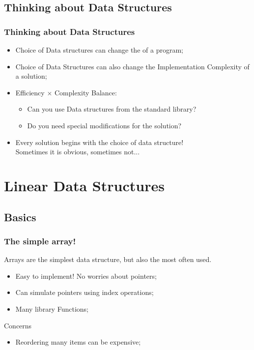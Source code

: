 \documentclass{beamer}
\begin{document}
\subsection{Thinking about Data Structures}
\begin{frame}
  \frametitle{Thinking about Data Structures}
  \begin{itemize}
  \item Choice of Data structures can change the  of a program;
  \item Choice of Data Structures can also change the \alert{Implementation Complexity} of a solution;
    \bigskip
  \item Efficiency $\times$ Complexity Balance:
    \begin{itemize}
    \item Can you use Data structures from the standard library?
    \item Do you need special modifications for the solution?
    \end{itemize}
    \bigskip
  \item Every solution begins with the choice of data structure!\\
    {\small Sometimes it is obvious, sometimes not...}
  \end{itemize}
\end{frame}


\section{Linear Data Structures}
\subsection{Basics}

\begin{frame}
  \frametitle{The simple array!}
  Arrays are the simplest data structure, but also the most often used.

  \bigskip

  \begin{itemize}
  \item Easy to implement! No worries about pointers;
  \item Can simulate pointers using index operations;
  \item Many library Functions;
  \end{itemize}

  \bigskip

  \alert{Concerns}
  \begin{itemize}
  \item Reordering many items can be expensive;
  \end{itemize}
\end{frame}
\end{document}
